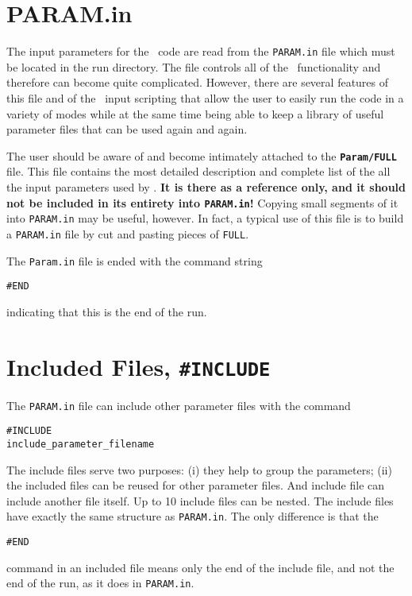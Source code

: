 %

\section{PARAM.in \label{section:param.in}}

The input parameters for the \BATSRUS\ code are read from the 
{\tt PARAM.in} file which must be located in the run directory.
The file controls all of the \BATSRUS\ functionality and therefore
can become quite complicated. However,
there are several features of this file and of the \BATSRUS\
input scripting that allow the user to easily run the code
in a variety of modes while at the same time being able to 
keep a library of useful parameter files that can be used
again and again.

The user should be aware of and become intimately attached to the 
{\bf {\tt Param/FULL}} file.  This file contains the most detailed 
description and complete list of the all the input parameters
used by \BATSRUS. {\bf It is there as a reference only,
and it should not be included in its entirety into {\tt PARAM.in}!} 
Copying small segments of it
into {\tt PARAM.in} may be useful, however.  In fact, a typical use
of this file is to build a {\tt PARAM.in} file by cut and pasting
pieces of {\tt FULL}. 

The {\tt Param.in} file is ended with the command string
\begin{verbatim}
#END
\end{verbatim}
indicating that this is the end of the run.

\section{Included Files, {\tt \#INCLUDE} \label{section:include}}

The {\tt PARAM.in} file can include other parameter files with the 
command
\begin{verbatim}
#INCLUDE
include_parameter_filename
\end{verbatim}
The include files serve two purposes: (i) they help
to group the parameters; (ii) the included files can be reused
for other parameter files. 
And include file can include another file itself.
Up to 10 include files can be nested.
The include files have exactly the same structure as {\tt PARAM.in}. 
The only difference is that the
\begin{verbatim}
#END
\end{verbatim}
command in an included file means only the end of the include file, 
and not the end of the run, as it does in {\tt PARAM.in}.


